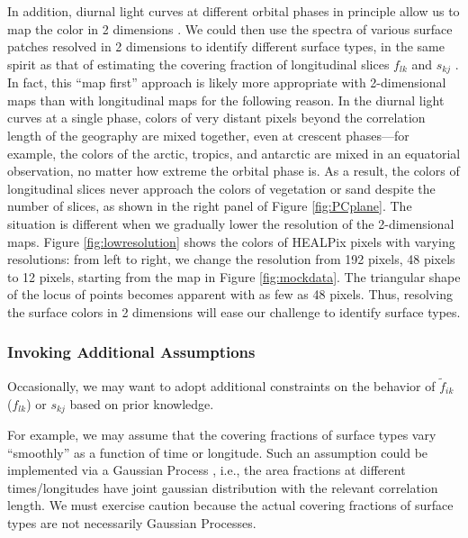 \documentclass[iop,numberedappendix,apj]{emulateapj}
\def\fast{\tilde f}
\def\edit#1{\textcolor{red}{#1}}
\begin{document}
In addition, diurnal light curves at different orbital phases in principle allow us to map the color in 2 dimensions \citep{Kawahara2010,Kawahara2011,Fujii2012}. 
We could then use the spectra of various surface patches resolved in 2 dimensions to identify different surface types, in the same spirit as that of estimating the covering fraction of longitudinal slices $f_{lk}$ and $s_{kj}$ . 
In fact, this ``map first'' approach is likely more appropriate with 2-dimensional maps than with longitudinal maps for the following reason. 
In the diurnal light curves at a single phase, colors of very distant pixels beyond the correlation length of the geography are mixed together, even at crescent phases---for example, the colors of the arctic, tropics, and antarctic are mixed in an equatorial observation, no matter how extreme the orbital phase is. 
As a result, the colors of longitudinal slices never approach the colors of vegetation or sand despite the number of slices, as shown in the right panel of Figure \ref{fig:PCplane}. 
The situation is different when we gradually lower the resolution of the 2-dimensional maps. 
Figure \ref{fig:lowresolution} shows the colors of HEALPix pixels \citep{Gorski2005} with varying resolutions: from left to right, we change the resolution from 192 pixels, 48 pixels to 12 pixels, starting from the map in Figure \ref{fig:mockdata}. 
The triangular shape of the locus of points becomes apparent with as few as 48 pixels. 
Thus, resolving the surface colors in 2 dimensions will ease our challenge to identify surface types. 



\subsubsection{Invoking Additional Assumptions}

Occasionally, we may want to adopt additional constraints on the behavior of $\fast _{ik}$ ($f_{lk}$) or $s_{kj}$ based on prior knowledge. 

For example, we may assume that the covering fractions of surface types vary  ``smoothly'' as a function of time or longitude. 
Such an assumption could be implemented via a Gaussian Process \citep[e.g.,][]{Rasmussen2005}, i.e., the area fractions at different times/longitudes have joint gaussian distribution with the relevant correlation length. 
We must exercise caution because the actual covering fractions of surface types are not necessarily Gaussian Processes. 
\end{document}
